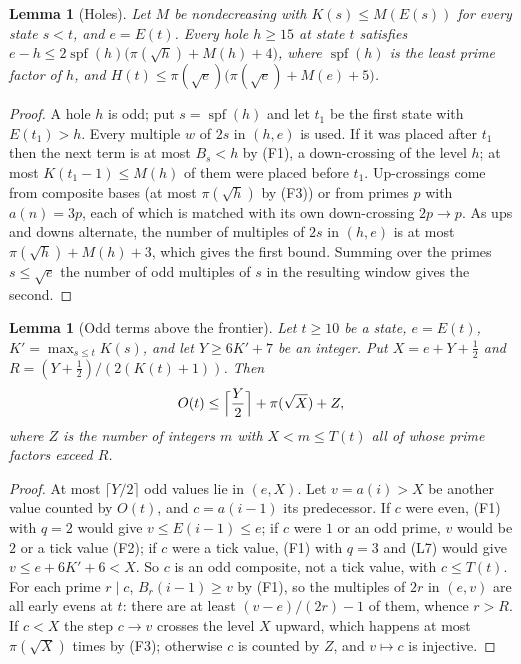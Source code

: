 \documentclass[11pt]{article}
\newtheorem{lemma}[theorem]{Lemma}
\theoremstyle{definition}
\theoremstyle{remark}
\newcommand{\spf}{\operatorname{spf}}
\begin{document}
\begin{lemma}[Holes]\label{lem:C}
Let $M$ be nondecreasing with $K(s)\le M(E(s))$ for every state $s<t$, and
$e=E(t)$. Every hole $h\ge15$ at state $t$ satisfies
$e-h\le2\spf(h)\bigl(\pi(\sqrt h)+M(h)+4\bigr)$, where $\spf(h)$ is the
least prime factor of $h$, and
$H(t)\le\pi(\sqrt e)\bigl(\pi(\sqrt e)+M(e)+5\bigr)$.
\end{lemma}

\begin{proof}
A hole $h$ is odd; put $s=\spf(h)$ and let $t_1$ be the first state with
$E(t_1)>h$. Every multiple $w$ of $2s$ in $(h,e)$ is used. If it was
placed after $t_1$ then the next term is at most $B_s<h$ by (F1), a
down-crossing of the level $h$; at most $K(t_1-1)\le M(h)$ of them were
placed before $t_1$. Up-crossings come from composite bases (at most
$\pi(\sqrt h)$ by (F3)) or from primes $p$ with $a(n)=3p$, each of which is
matched with its own down-crossing $2p\to p$. As ups and downs alternate,
the number of multiples of $2s$ in $(h,e)$ is at most
$\pi(\sqrt h)+M(h)+3$, which gives the first bound. Summing over the
primes $s\le\sqrt e$ the number of odd multiples of $s$ in the resulting
window gives the second.
\end{proof}

\begin{lemma}[Odd terms above the frontier]\label{lem:D}
Let $t\ge10$ be a state, $e=E(t)$, $K'=\max_{s\le t}K(s)$, and let $Y\ge
6K'+7$ be an integer. Put $X=e+Y+\tfrac12$ and $R=(Y+\tfrac12)/(2(K(t)+1))$. Then
\[ O(t)\le\Bigl\lceil\frac Y2\Bigr\rceil+\pi(\sqrt X)+Z,\]
where $Z$ is the number of integers $m$ with $X<m\le T(t)$ all of whose
prime factors exceed $R$.
\end{lemma}

\begin{proof}
At most $\lceil Y/2\rceil$ odd values lie in $(e,X)$. Let $v=a(i)>X$ be
another value counted by $O(t)$, and $c=a(i-1)$ its predecessor. If $c$
were even, (F1) with $q=2$ would give $v\le E(i-1)\le e$; if $c$ were $1$
or an odd prime, $v$ would be $2$ or a tick value (F2); if $c$ were a tick
value, (F1) with $q=3$ and (L7) would give $v\le e+6K'+6<X$. So $c$ is an
odd composite, not a tick value, with $c\le T(t)$. For each prime
$r\mid c$, $B_r(i-1)\ge v$ by (F1), so the multiples of $2r$ in $(e,v)$
are all early evens at $t$: there are at least $(v-e)/(2r)-1$ of them,
whence $r>R$. If $c<X$ the step $c\to v$ crosses the level $X$ upward,
which happens at most $\pi(\sqrt X)$ times by (F3); otherwise $c$ is
counted by $Z$, and $v\mapsto c$ is injective.
\end{proof}
\end{document}
